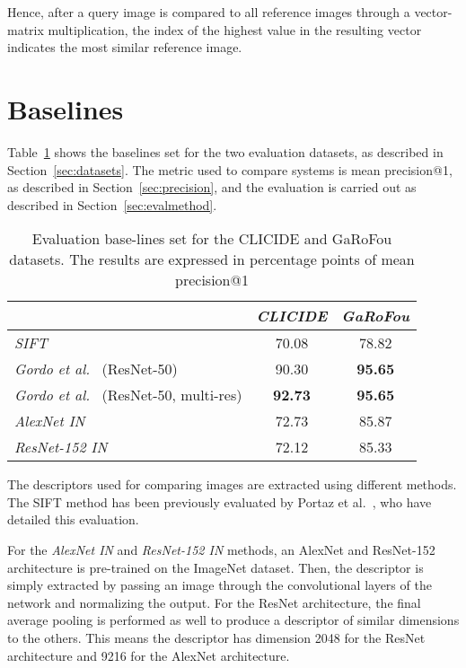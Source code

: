 Hence, after a query image is compared to all reference images through
a vector-matrix multiplication, the index of the highest value in the
resulting vector indicates the most similar reference image.

\section{Baselines}\label{sec:baselines}
Table~\ref{tab:baselines} shows the baselines set for the two evaluation
datasets, as described in Section~\ref{sec:datasets}. The metric used
to compare systems is mean precision@1, as described in
Section~\ref{sec:precision}, and the evaluation is carried out as
described in Section~\ref{sec:evalmethod}.

\begin{table}
\centering
\begin{tabular}{|l|c|c|}
\hline & \emph{CLICIDE} & \emph{GaRoFou}\\
\hline \emph{SIFT} & 70.08 & 78.82\\
\hline \emph{Gordo et al.}~\cite{gordo_deep_2016} (ResNet-50) & 90.30 & \textbf{95.65}\\
\hline \emph{Gordo et al.}~\cite{gordo_deep_2016} (ResNet-50, multi-res)
& \textbf{92.73} & \textbf{95.65}\\
\hline \emph{AlexNet IN} & 72.73 & 85.87\\
\hline \emph{ResNet-152 IN} & 72.12 & 85.33\\
\hline
\end{tabular}
\caption{Evaluation base-lines set for the CLICIDE and GaRoFou datasets.
The results are expressed in percentage points of
mean precision@1\label{tab:baselines}}
\end{table}

The descriptors used for comparing images are extracted using different
methods.
The SIFT method has been previously evaluated by
Portaz et al.~\cite{portaz_construction_2017}, who have detailed this
evaluation.

For the \emph{AlexNet IN} and \emph{ResNet-152 IN} methods,
an AlexNet and ResNet-152 architecture is pre-trained on the ImageNet dataset.
Then, the descriptor is simply extracted by passing an image through the
convolutional layers of the
network and normalizing the output. For the ResNet architecture, the final
average pooling is performed as well to produce a descriptor of similar
dimensions to the others. This means the descriptor has dimension 2048
for the ResNet architecture and 9216 for the AlexNet architecture.

